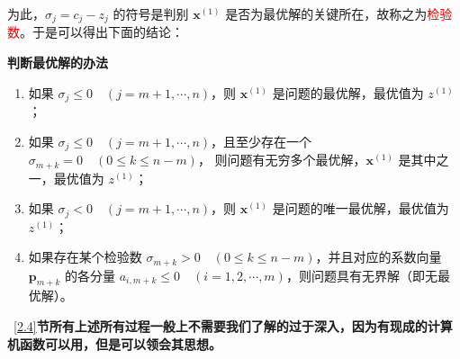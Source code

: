     为此，\( \sigma_j = c_j - z_j \) 的符号是判别 \( \mathbf{x}^{(1)} \) 是否为最优解的关键所在，故称之为\textcolor{red}{检验数}。于是可以得出下面的结论：
    \begin{notebox}{\textbf{判断最优解的办法}}
        \begin{enumerate}
            \item 如果 \( \sigma_j \leq 0 \quad (j = m+1, \cdots, n) \)，则 \( \mathbf{x}^{(1)} \) 是问题的最优解，最优值为 \( z^{(1)} \)；
            \item 如果 \( \sigma_j \leq 0 \quad (j = m+1, \cdots, n) \)，且至少存在一个 \( \sigma_{m+k} = 0 \quad (0 \leq k \leq n-m) \)，
            则问题有无穷多个最优解，\( \mathbf{x}^{(1)} \) 是其中之一，最优值为 \( z^{(1)} \)；
            \item 如果 \( \sigma_j < 0 \quad (j = m+1, \cdots, n) \)，则 \( \mathbf{x}^{(1)} \) 是问题的唯一最优解，最优值为 \( z^{(1)} \)；
            \item 如果存在某个检验数 \( \sigma_{m+k} > 0 \quad (0 \leq k \leq n-m) \)，并且对应的系数向量 \( \mathbf{p}_{m+k} \) 的各分量
            \( a_{i, m+k} \leq 0 \quad (i = 1, 2, \cdots, m) \)，则问题具有无界解（即无最优解）。
        \end{enumerate}
    \end{notebox}
    
    ~\ref{2.4}\textbf{节所有上述所有过程一般上不需要我们了解的过于深入，因为有现成的计算机函数可以用，但是可以领会其思想。}

